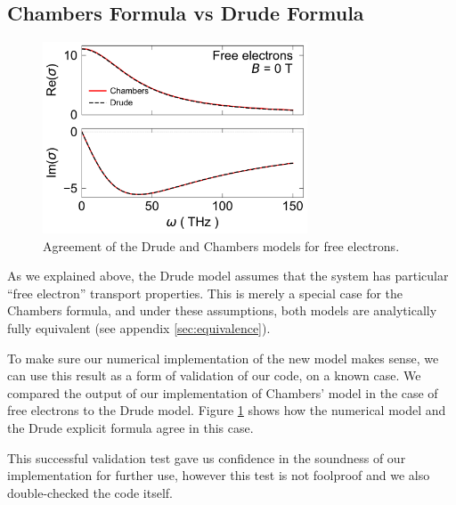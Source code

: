 \subsection{Chambers Formula vs Drude Formula}
\begin{figure}
    \centering
    \includegraphics[width=0.7\textwidth]{figures/free_electrons}
    \caption{Agreement of the Drude and Chambers models for free electrons.}
    \label{fig:free_electrons}
\end{figure}

As we explained above, %
the Drude model assumes that the system has particular ``free electron'' transport properties. 
This is merely a special case for the Chambers formula, 
and under these assumptions, 
both models are analytically fully equivalent (see appendix \ref{sec:equivalence}).

To make sure our numerical implementation of the new model makes sense, 
we can use this result as a form of validation of our code, on a known case. 
We compared the output of our implementation of Chambers' model in the case of free electrons to the Drude model. 
Figure \ref{fig:free_electrons} shows how the numerical model and the Drude explicit formula agree in this case.

This successful validation test gave us confidence in the soundness of our implementation for further use, 
however this test is not foolproof and we also double-checked the code itself.